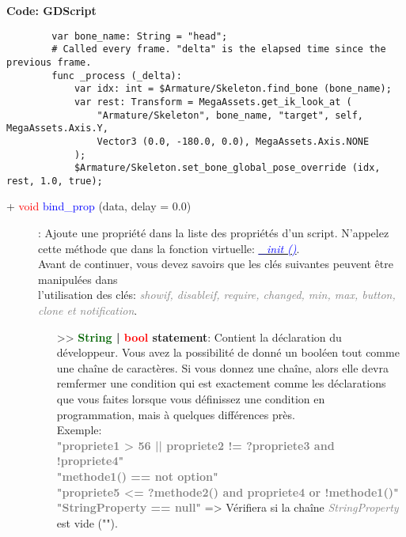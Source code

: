 \documentclass[a4paper, 11pt]{article}
\begin{document}
	\newpage \textbf{Code: GDScript}
	\begin{lstlisting}
		var bone_name: String = "head";
		# Called every frame. "delta" is the elapsed time since the previous frame.
		func _process (_delta):
			var idx: int = $Armature/Skeleton.find_bone (bone_name);
			var rest: Transform = MegaAssets.get_ik_look_at (
				"Armature/Skeleton", bone_name, "target", self, MegaAssets.Axis.Y,
				Vector3 (0.0, -180.0, 0.0), MegaAssets.Axis.NONE
			);
			$Armature/Skeleton.set_bone_global_pose_override (idx, rest, 1.0, true);
	\end{lstlisting}
	\begin{description}
		\item [+ \textcolor{red}{void} \textcolor{blue}{\hypertarget{bindprop}{bind\_prop}} (data, delay = 
		0.0)]: Ajoute une propriété dans la liste des propriétés d'un script. N'appelez cette méthode que 
		dans la fonction virtuelle:
		\href{https://docs.godotengine.org/fr/stable/classes/class_object.html#class-object-method-init}
		{\textit{\textcolor{blue}{\_init ()}}}. \\Avant de continuer, vous devez savoirs que les clés 
		suivantes peuvent être manipulées dans \\l'utilisation des clés:
		\textit{\textcolor {gray}{showif, disableif, require, changed, min, max, button, clone et
		notification}}.
		\begin{itemize}
		    \item[>> \textbf{\textcolor{darkgreen}{String} | \textcolor{red}{bool} statement}:] Contient la 
		    déclaration du développeur. Vous avez la possibilité de donné un booléen tout comme une chaîne 
		    de caractères. Si vous donnez une chaîne, alors elle devra remfermer une condition qui est 
		    exactement comme les déclarations que vous faites lorsque vous définissez une condition en 
		    programmation, mais à quelques différences près. \\Exemple:\\
		    \textbf{\textcolor {gray}{"propriete1 > 56 || propriete2 != ?propriete3 and !propriete4"}}\\
		    \textbf{\textcolor {gray}{"methode1() == not option"}}\\
		    \textbf{\textcolor {gray}{"propriete5 <= ?methode2() and propriete4 or !methode1()"}}\\
		    \textbf{\textcolor {gray}{"StringProperty == null"}} => Vérifiera si la chaîne
		    \textit{\textcolor {gray}{StringProperty}} est vide ("").\\

\end{itemize}
\end{description}
\end{document}
